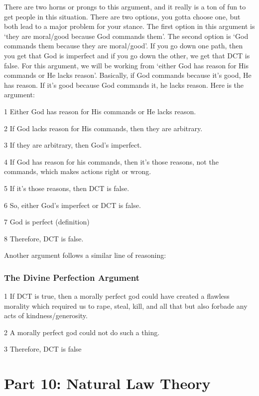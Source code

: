 There are two horns or prongs to this argument, and it really is a ton of fun to get people in this situation. There are two options, you gotta choose one, but both lead to a major problem for your stance. The first option in this argument is ‘they are moral/good because God commands them’. The second option is ‘God commands them because they are moral/good’. If you go down one path, then you get that God is imperfect and if you go down the other, we get that DCT is false. For this argument, we will be working from ‘either God has reason for His commands or He lacks reason’. Basically, if God commands because it’s good, He has reason. If it’s good because God commands it, he lacks reason.  Here is the argument:
\begin{earg}
    \item[1] Either God has reason for His commands or He lacks reason.
    \item[2] If God lacks reason for His commands, then they are arbitrary.
    \item[3] If they are arbitrary, then God’s imperfect.
    \item[4] If God has reason for his commands, then it’s those reasons, not the commands, which makes actions right or wrong.
    \item[5] If it’s those reasons, then DCT is false.
    \item[6] So, either God’s imperfect or DCT is false.
    \item[7] God is perfect (definition)
    \item[8] Therefore, DCT is false. 
\end{earg}
Another argument follows a similar line of reasoning:

\subsection{The Divine Perfection Argument}
\begin{earg}
    \item[1] If DCT is true, then a morally perfect god could have created a flawless morality which required us to rape, steal, kill, and all that but also forbade any acts of kindness/generosity.
    \item[2] A morally perfect god could not do such a thing.
    \item[3] Therefore, DCT is false
\end{earg}

\chapter{Part 10: Natural Law Theory}

